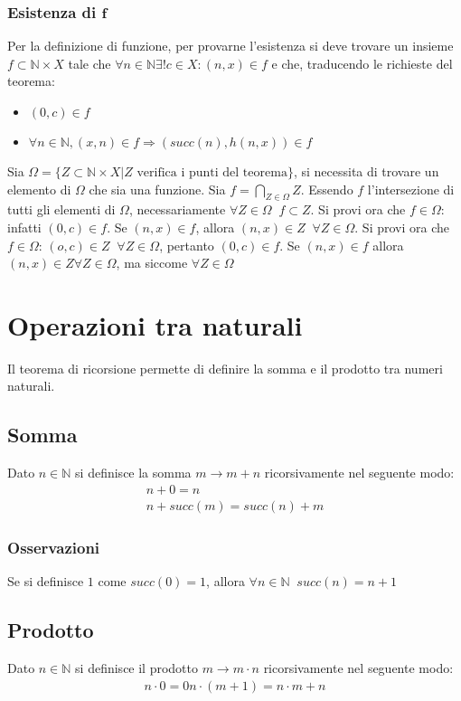 \subsubsection{Esistenza di $\mathbf{f}$}
Per la definizione di funzione, per provarne l'esistenza si deve trovare un insieme $f\subset\mathbb{N}\times X$ tale che $\forall n\in\mathbb{N}\exists! c\in X:(n,x)\in f$ e 
che, traducendo le richieste del teorema:
\begin{itemize}
\item $(0,c)\in f$
\item $\forall n\in\mathbb{N}, (x,n)\in f\Rightarrow(succ(n),h(n,x))\in f$
\end{itemize}
Sia $\Omega=\{Z\subset\mathbb{N}\times X|Z\text{ verifica i punti del teorema}\}$, si necessita di trovare un elemento di $\Omega$ che sia una funzione. Sia $f=\bigcap\limits_{Z
\in\Omega}Z$. Essendo $f$ l'intersezione di tutti gli elementi di $\Omega$, necessariamente $\forall Z\in\Omega\;\;f\subset Z$. Si provi ora che $f\in\Omega$: infatti $(0,c)\in f
$. Se $(n,x)\in f$, allora $(n,x)\in Z\;\;\forall Z\in\Omega$. Si provi ora che $f\in\Omega$: $(o,c)\in Z\;\;\forall Z\in\Omega$, pertanto $(0,c)\in f$. Se $(n,x)\in f$ allora 
$(n,x)\in Z\forall Z\in\Omega$, ma siccome $\forall Z\in\Omega$
\section{Operazioni tra naturali}
Il teorema di ricorsione permette di definire la somma e il prodotto tra numeri naturali.
\subsection{Somma}
Dato $n\in\mathbb{N}$ si definisce la somma $m\rightarrow m+n$ ricorsivamente nel seguente modo:
\begin{gather*}
n+0=n\\
n+succ(m)=succ(n)+m
\end{gather*}
\subsubsection{Osservazioni}
Se si definisce $1$ come $succ(0)=1$, allora $\forall n\in\mathbb{N}\;\;succ(n)=n+1$
\subsection{Prodotto}
Dato $n\in\mathbb{N}$ si definisce il prodotto $m\rightarrow m\cdot n$ ricorsivamente nel seguente modo:
\begin{gather*}
n\cdot 0=0
n\cdot(m+1)=n\cdot m+n
\end{gather*}
